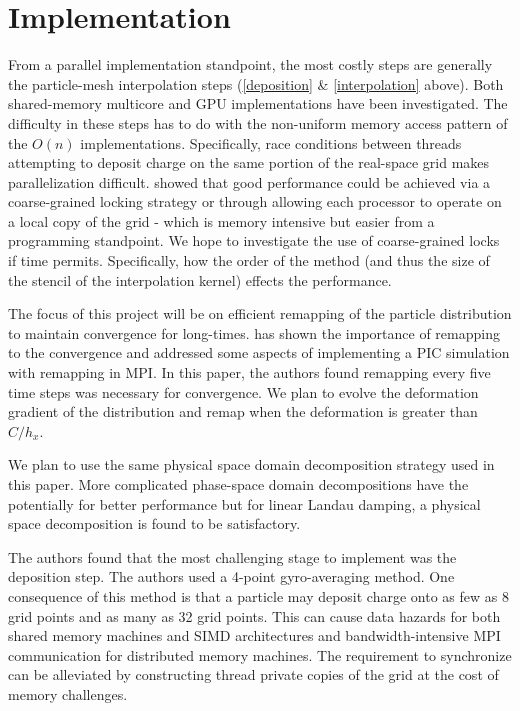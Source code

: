 \documentclass[aps,12pt]{revtex4-1}
\renewcommand{\=}[1]{\overline{#1}}
\begin{document}
\section{Implementation}
From a parallel implementation standpoint, the most costly steps are generally the particle-mesh interpolation steps (\ref{deposition} \& \ref{interpolation} above). 
Both shared-memory multicore \cite{madduri2012optimization} and GPU \cite{buyukkecceci2013portable, stantchev2008fast} implementations have been investigated. The difficulty in these steps has to do with the non-uniform memory access pattern of the $O(n)$ implementations. Specifically, race conditions between threads attempting to deposit charge on      
the same portion of the real-space grid makes parallelization difficult. \cite{madduri2012optimization} showed that good performance could be achieved via a coarse-grained locking strategy or through allowing each processor to operate on a local copy of the grid - which is memory intensive but easier from a programming standpoint. We hope to investigate the use of coarse-grained locks if time permits. Specifically, how the order of the method (and thus the size of the stencil of the interpolation kernel) effects the performance.

The focus of this project will be on efficient remapping of the particle distribution to maintain convergence for long-times. \cite{2dwangpaper} has shown the importance of remapping to the convergence and addressed some aspects of implementing a PIC simulation with remapping in MPI. In this paper, the authors found remapping every five time steps was necessary for convergence. We plan to evolve the deformation gradient of the distribution and remap when the deformation is greater than $C/ h_x$.  

We plan to use the same physical space domain decomposition strategy used in this paper. More complicated phase-space domain decompositions have the potentially for better performance but for linear Landau damping, a physical space decomposition is found to be satisfactory.   
 


\bigskip
The authors found that the most challenging stage to implement was the deposition step. The authors used a 4-point gyro-averaging method. One consequence of this method is that a particle may deposit charge onto as few as 8 grid points and as many as 32 grid points. This can cause data hazards for both shared memory machines and SIMD architectures and bandwidth-intensive MPI communication for distributed memory machines. The requirement to synchronize can be alleviated by constructing thread private copies of the grid at the cost of memory challenges. 
\end{document}
